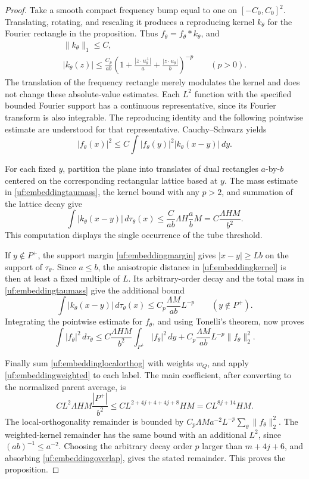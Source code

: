 \begin{proof}
Take a smooth compact frequency bump equal to one on
\([-C_0,C_0]^2\). Translating, rotating, and rescaling it produces
a reproducing kernel \(k_\theta\) for the Fourier rectangle in the
proposition. Thus \(f_\theta=f_\theta*k_\theta\), and
\begin{gather}\label{uf:embeddingkernel}
 \|k_\theta\|_1\leq C,\\
 |k_\theta(z)|\leq\frac{C_p}{ab}
 \left(1+\frac{|z\cdot u_\theta^\perp|}{a}
          +\frac{|z\cdot u_\theta|}{b}\right)^{-p}
 \qquad(p>0).\nonumber
\end{gather}
The translation of the frequency rectangle merely modulates the kernel
and does not change these absolute-value estimates. Each \(L^2\)
function with the specified bounded Fourier support has a continuous
representative, since its Fourier transform is also integrable.
The reproducing identity and the following pointwise estimate are
understood for that representative. Cauchy--Schwarz yields
$$
 |f_\theta(x)|^2
 \leq C\int|f_\theta(y)|^2|k_\theta(x-y)|\,dy.
$$

For each fixed \(y\), partition the plane into translates of dual
rectangles \(a\)-by-\(b\) centered on the corresponding rectangular
lattice based at \(y\). The mass estimate in
\eqref{uf:embeddingtaumass}, the kernel bound with any \(p>2\), and
summation of the lattice decay give
\begin{equation}\label{uf:embeddingkerneldensity}
 \int|k_\theta(x-y)|\,d\tau_\theta(x)
 \leq\frac C{ab}\Lambda H\frac ab M
 = C\frac{\Lambda HM}{b^2}.
\end{equation}
This computation displays the single occurrence of the tube threshold.

If \(y\notin P^+\), the support margin
\eqref{uf:embeddingmargin} gives \(|x-y|\geq Lb\) on the support
of \(\tau_\theta\). Since \(a\leq b\), the anisotropic distance
in \eqref{uf:embeddingkernel} is then at least a fixed multiple of
\(L\). Its arbitrary-order decay and the total mass in
\eqref{uf:embeddingtaumass} give the additional bound
$$
 \int|k_\theta(x-y)|\,d\tau_\theta(x)
 \leq C_p\frac{\Lambda M}{ab}L^{-p}
 \qquad(y\notin P^+).
$$
Integrating the pointwise estimate for \(f_\theta\), and using
Tonelli's theorem, now proves
\begin{equation}\label{uf:embeddingweighted}
 \int|f_\theta|^2\,d\tau_\theta
 \leq C\frac{\Lambda HM}{b^2}
              \int_{P^+}|f_\theta|^2\,dy
      +C_p\frac{\Lambda M}{ab}L^{-p}\|f_\theta\|_2^2.
\end{equation}

Finally sum \eqref{uf:embeddinglocalorthog} with weights \(w_Q\),
and apply \eqref{uf:embeddingweighted} to each label. The main
coefficient, after converting to the normalized parent average, is
$$
 C L^2\Lambda H M\frac{|P^+|}{b^2}
 \leq C L^{2+4j+4+4j+8}HM
 =C L^{8j+14}HM.
$$
The local-orthogonality remainder is bounded by
\(C_p\Lambda M a^{-2}L^{-p}\sum_\theta\|f_\theta\|_2^2\).
The weighted-kernel remainder has the same bound with an additional
\(L^2\), since \((ab)^{-1}\leq a^{-2}\).
Choosing the arbitrary decay order \(p\) larger than
\(m+4j+6\), and absorbing \eqref{uf:embeddingoverlap}, gives the
stated remainder. This proves the proposition.
\end{proof}

